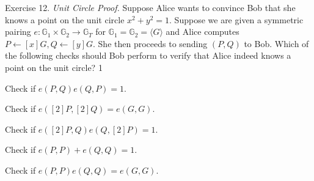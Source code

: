 \documentclass[../../book.tex]{subfiles}
\begin{document}
\begin{xexercise}
    {Exercise 12.}
    {\textit{Unit Circle Proof.} Suppose Alice wants to convince Bob that she knows a point on the unit circle $x^2+y^2=1$. Suppose we are given a symmetric pairing $e: \mathbb{G}_1 \times \mathbb{G}_2 \to \mathbb{G}_T$ for $\mathbb{G}_1=\mathbb{G}_2=\langle G \rangle$ and Alice computes $P \gets [x]G, Q \gets [y]G$. She then proceeds to sending $(P,Q)$ to Bob. Which of the following checks should Bob perform to verify that Alice indeed knows a point on the unit circle?}
    {1}
    {
        \item Check if $e(P,Q)e(Q,P)=1$.
        \item Check if $e([2]P,[2]Q) = e(G,G)$.
        \item Check if $e([2]P,Q)e(Q,[2]P) = 1$.
        \item Check if $e(P,P)+e(Q,Q) = 1$.
        \item Check if $e(P,P)e(Q,Q)=e(G,G)$.
    }
\end{xexercise}
\end{document}
